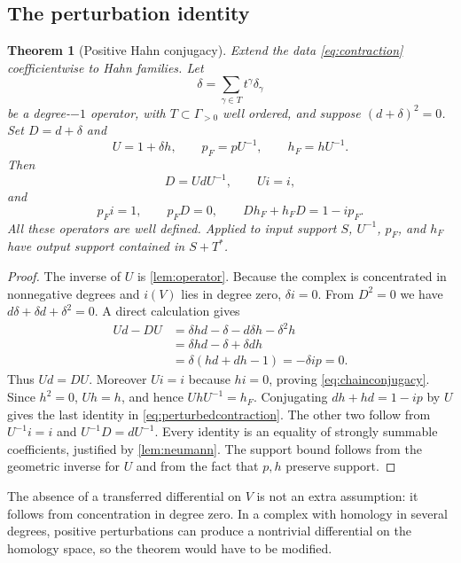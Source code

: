 \documentclass[11pt]{article}
\newtheorem{theorem}{Theorem}[section]
\theoremstyle{definition}
\begin{document}
\subsection{The perturbation identity}
\begin{theorem}[Positive Hahn conjugacy]\label{thm:conjugacy}
Extend the data \eqref{eq:contraction} coefficientwise to Hahn families. Let
\[
 \delta=\sum_{\gamma\in T}t^\gamma\delta_\gamma
\]
be a degree-$-1$ operator, with $T\subset\Gamma_{>0}$ well ordered, and suppose $(d+\delta)^2=0$. Set $D=d+\delta$ and
\begin{equation}\label{eq:perturbedmaps}
 U=1+\delta h,\qquad
 p_F=pU^{-1},\qquad h_F=hU^{-1}.
\end{equation}
Then
\begin{equation}\label{eq:chainconjugacy}
 D=UdU^{-1},\qquad Ui=i,
\end{equation}
and
\begin{equation}\label{eq:perturbedcontraction}
 p_Fi=1,\qquad p_FD=0,\qquad
 Dh_F+h_FD=1-ip_F.
\end{equation}
All these operators are well defined. Applied to input support $S$, $U^{-1}$, $p_F$, and $h_F$ have output support contained in $S+T^*$.
\end{theorem}
\begin{proof}
The inverse of $U$ is \cref{lem:operator}. Because the complex is concentrated in nonnegative degrees and $i(V)$ lies in degree zero, $\delta i=0$. From $D^2=0$ we have $d\delta+\delta d+\delta^2=0$. A direct calculation gives
\begin{align*}
 Ud-DU
 &=\delta hd-\delta-d\delta h-\delta^2h\\
 &=\delta hd-\delta+\delta dh\\
 &=\delta(hd+dh-1)=-\delta ip=0.
\end{align*}
Thus $Ud=DU$. Moreover $Ui=i$ because $hi=0$, proving \eqref{eq:chainconjugacy}. Since $h^2=0$, $Uh=h$, and hence $UhU^{-1}=h_F$. Conjugating $dh+hd=1-ip$ by $U$ gives the last identity in \eqref{eq:perturbedcontraction}. The other two follow from $U^{-1}i=i$ and $U^{-1}D=dU^{-1}$. Every identity is an equality of strongly summable coefficients, justified by \cref{lem:neumann}. The support bound follows from the geometric inverse for $U$ and from the fact that $p,h$ preserve support.
\end{proof}
The absence of a transferred differential on $V$ is not an extra assumption: it follows from concentration in degree zero. In a complex with homology in several degrees, positive perturbations can produce a nontrivial differential on the homology space, so the theorem would have to be modified.
\end{document}
